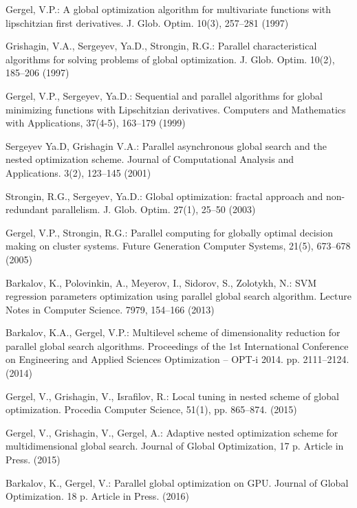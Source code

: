 \documentclass{llncs}
\begin{document}
\begin{thebibliography}{99}
Gergel, V.P.: A global optimization algorithm for multivariate functions with lipschitzian first derivatives. J. Glob. Optim. 10(3), 257--281 (1997)

Grishagin, V.A., Sergeyev, Ya.D., Strongin, R.G.: Parallel characteristical algorithms for solving problems of global optimization. J. Glob. Optim. 10(2), 185--206 (1997)

Gergel, V.P., Sergeyev, Ya.D.: Sequential and parallel algorithms for global minimizing functions with Lipschitzian derivatives. Computers and Mathematics with Applications, 37(4-5), 163--179 (1999)

Sergeyev Ya.D, Grishagin V.A.: Parallel asynchronous global search and the nested optimization scheme. Journal of Computational Analysis and Applications. 3(2), 123--145 (2001)

Strongin, R.G., Sergeyev, Ya.D.: Global optimization: fractal approach and non-redundant parallelism. J. Glob. Optim. 27(1), 25--50 (2003)

Gergel, V.P., Strongin, R.G.: Parallel computing for globally optimal decision making on cluster systems. Future Generation Computer Systems, 21(5), 673--678 (2005)

Barkalov, K., Polovinkin, A., Meyerov, I., Sidorov, S., Zolotykh, N.: SVM regression parameters optimization using parallel global search algorithm. Lecture Notes in Computer Science. 7979, 154--166 (2013)

Barkalov, K.A., Gergel, V.P.: Multilevel scheme of dimensionality reduction for parallel global search algorithms. Proceedings of the 1st International Conference on Engineering and Applied Sciences Optimization -- OPT-i 2014. pp. 2111--2124. (2014)

Gergel, V., Grishagin, V., Israfilov, R.: Local tuning in nested scheme of global optimization. Procedia Computer Science, 51(1), pp. 865--874. (2015)

Gergel, V., Grishagin, V., Gergel, A.: Adaptive nested optimization scheme for multidimensional global search. Journal of Global Optimization, 17 p. Article in Press. (2015)

Barkalov, K., Gergel, V.: Parallel global optimization on GPU. Journal of Global Optimization. 18 p. Article in Press. (2016) 


\end{thebibliography}
\end{document}
